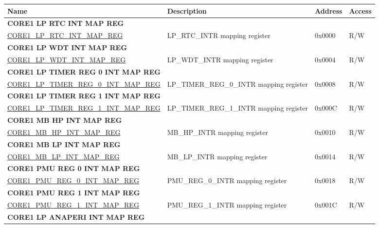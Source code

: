 \begin{longtable}{ | p{7.5cm} | p{7.2cm} | p{1.3cm} | p{1cm} | }
\hline\rowcolor{lightgray}
Name & Description &  Address & Access \\ \hline
\endhead
\multicolumn{4}{|l|}{\textbf{CORE1 LP RTC INT MAP REG}} \\ \hline
\hyperref[regdesc:CORE1LPRTCINTMAPREG]{CORE1\_LP\_RTC\_INT\_MAP\_REG} & LP\_RTC\_INTR mapping register & 0x0000 & R/W \\ \hline
\multicolumn{4}{|l|}{\textbf{CORE1 LP WDT INT MAP REG}} \\ \hline
\hyperref[regdesc:CORE1LPWDTINTMAPREG]{CORE1\_LP\_WDT\_INT\_MAP\_REG} & LP\_WDT\_INTR mapping register & 0x0004 & R/W \\ \hline
\multicolumn{4}{|l|}{\textbf{CORE1 LP TIMER REG 0 INT MAP REG}} \\ \hline
\hyperref[regdesc:CORE1LPTIMERREG0INTMAPREG]{CORE1\_LP\_TIMER\_REG\_0\_INT\_MAP\_REG} & LP\_TIMER\_REG\_0\_INTR mapping register & 0x0008 & R/W \\ \hline
\multicolumn{4}{|l|}{\textbf{CORE1 LP TIMER REG 1 INT MAP REG}} \\ \hline
\hyperref[regdesc:CORE1LPTIMERREG1INTMAPREG]{CORE1\_LP\_TIMER\_REG\_1\_INT\_MAP\_REG} & LP\_TIMER\_REG\_1\_INTR mapping register & 0x000C & R/W \\ \hline
\multicolumn{4}{|l|}{\textbf{CORE1 MB HP INT MAP REG}} \\ \hline
\hyperref[regdesc:CORE1MBHPINTMAPREG]{CORE1\_MB\_HP\_INT\_MAP\_REG} & MB\_HP\_INTR mapping register & 0x0010 & R/W \\ \hline
\multicolumn{4}{|l|}{\textbf{CORE1 MB LP INT MAP REG}} \\ \hline
\hyperref[regdesc:CORE1MBLPINTMAPREG]{CORE1\_MB\_LP\_INT\_MAP\_REG} & MB\_LP\_INTR mapping register & 0x0014 & R/W \\ \hline
\multicolumn{4}{|l|}{\textbf{CORE1 PMU REG 0 INT MAP REG}} \\ \hline
\hyperref[regdesc:CORE1PMUREG0INTMAPREG]{CORE1\_PMU\_REG\_0\_INT\_MAP\_REG} & PMU\_REG\_0\_INTR mapping register & 0x0018 & R/W \\ \hline
\multicolumn{4}{|l|}{\textbf{CORE1 PMU REG 1 INT MAP REG}} \\ \hline
\hyperref[regdesc:CORE1PMUREG1INTMAPREG]{CORE1\_PMU\_REG\_1\_INT\_MAP\_REG} & PMU\_REG\_1\_INTR mapping register & 0x001C & R/W \\ \hline
\multicolumn{4}{|l|}{\textbf{CORE1 LP ANAPERI INT MAP REG}} \\ \hline

\end{longtable}
